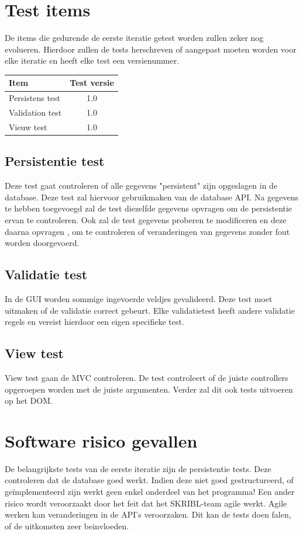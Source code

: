 \documentclass{article}
\begin{document}
\section{Test items}

De items die gedurende de eerste iteratie getest worden zullen zeker nog evolueren. Hierdoor zullen de tests  herschreven of aangepast moeten worden voor elke iteratie en heeft elke test een versienummer.

\begin{table}[h]
\begin{tabular}{l | c }
 Item&Test versie\\
 \hline
 Persistens test&1.0\\
 Validation test&1.0\\
 Vieuw test&1.0\\
\end{tabular}
\end{table}

\subsection{Persistentie test}
Deze test gaat controleren of alle gegevens "persistent" zijn opgeslagen in de database. 
\newline
Deze test zal hiervoor gebruikmaken van de database API. Na gegevens te hebben toegevoegd zal de test diezelfde gegevens opvragen om de persistentie ervan te controleren. Ook zal de test gegevens proberen te modificeren en deze daarna opvragen , om te controleren of veranderingen van gegevens zonder fout worden doorgevoerd. 

\subsection{Validatie test}
In de GUI worden sommige ingevoerde veldjes gevalideerd. Deze test moet uitmaken of de validatie correct gebeurt. Elke validatietest heeft andere validatie regels en vereist hierdoor een eigen specifieke test.

\subsection{View test}
View test gaan de MVC controleren. De test controleert of de juiste controllers opgeroepen worden met de juiste argumenten. Verder zal dit ook tests uitvoeren op het DOM. 

\section{Software risico gevallen}
De belangrijkste tests van de eerste iteratie zijn de persistentie tests. Deze controleren dat de database goed werkt. Indien deze niet goed gestructureerd, of ge{\"i}mplementeerd zijn werkt geen enkel onderdeel van het programma!
\newline
Een ander risico wordt veroorzaakt door het feit dat het SKRIBL-team agile werkt. Agile werken kan veranderingen in de API's veroorzaken. Dit kan de tests doen falen, of de uitkomsten zeer beinvloeden.
\end{document}

